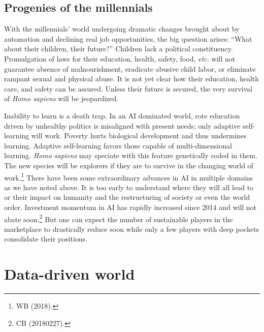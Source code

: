 \begin{multicols}{2}
\subsection*{Progenies of the millennials}

With the millennials' world undergoing dramatic changes brought about by automation and declining real job opportunities, the big question arises: “What about their children, their future?” Children lack a political constituency. Promulgation of laws for their education, health, safety, food, \textit{etc.} will not guarantee absence of malnourishment, eradicate abusive child labor, or eliminate rampant sexual and physical abuse. It is not yet clear how their education, health care, and safety can be assured. Unless their future is secured, the very survival of \textit{Homo sapiens} will be jeopardized.

Inability to learn is a death trap. In an AI dominated world, rote education driven by unhealthy politics is misaligned with present needs; only adaptive self-learning will work. Poverty hurts biological development and thus undermines learning. Adaptive self-learning favors those capable of multi-dimensional learning. \textit{Homo sapiens} may speciate with this feature genetically coded in them. The new species will be explorers if they are to survive in the changing world of work.\footnote{WB (2018).} There have been some extraordinary advances in AI in multiple domains as we have noted above. It is too early to understand where they will all lead to or their impact on humanity and the restructuring of society or even the world order. Investment momentum in AI has rapidly increased since 2014 and will not abate soon.\footnote{CB (20180227).}  But one can expect the number of sustainable players in the marketplace to drastically reduce soon while only a few players with deep pockets consolidate their positions.\\[-24pt]

\section{Data-driven world}

\vskip -4pt


\end{multicols}
